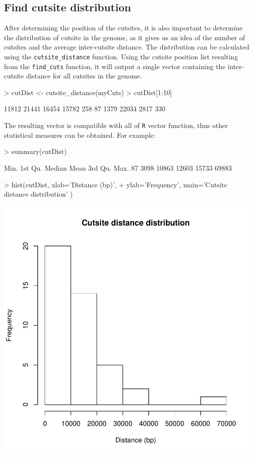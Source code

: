 \documentclass{article}
\begin{document}
\subsection{Find cutsite distribution}
After determining the position of the cutsites, it is also important to determine the distribution of cutsite in the genome, as it gives us an idea of the number of cutsites and the average inter-cutsite distance. The distribution can be calculated using the \texttt{cutsite\_distance} function. Using the cutsite position list resulting from the \texttt{find\_cuts} function, it will output a single vector containing the inter-cutsite distance for all cutsites in the genome.
\begin{Schunk}
\begin{Sinput}
> cutDist <- cutsite_distance(myCuts)
> cutDist[1:10]
\end{Sinput}
\begin{Soutput}
 [1] 11812 21441 16454 15782   258    87  1379 22034  2817   330
\end{Soutput}
\end{Schunk}
The resulting vector is compatible with all of \texttt{R} vector function, thus other statistical measures can be obtained. For example:
\begin{Schunk}
\begin{Sinput}
> summary(cutDist)
\end{Sinput}
\begin{Soutput}
   Min. 1st Qu.  Median    Mean 3rd Qu.    Max. 
     87    3098   10863   12603   15733   69883 
\end{Soutput}
\begin{Sinput}
> hist(cutDist, xlab='Distance (bp)', 
+      ylab='Frequency', main='Cutsite distance distribution' )
\end{Sinput}
\end{Schunk}
\includegraphics{Tutorial_for_RADseq_Tools-011}
\end{document}
